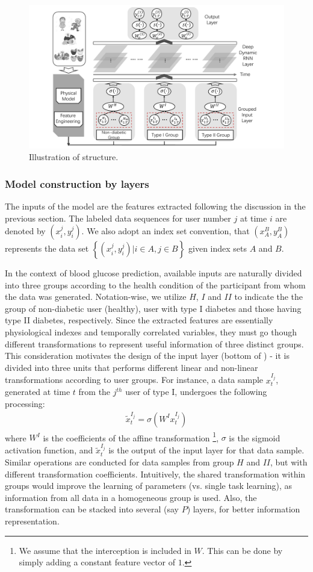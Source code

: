 \begin{figure}[h]
  \centering
  \includegraphics[width=0.75\columnwidth]{./img/pics_RNN3.pdf}
  \caption{Illustration of \modelname structure.}
  \label{fig:rnn}
\end{figure}

\subsubsection{Model construction by layers}
The inputs of the \modelname model are the features extracted following the discussion in the previous section.
The labeled data sequences for user number $j$ at time $i$ are denoted by $(x_i^{j},y_i^{j})$.
We also adopt an index set convention, that $(x_A^{B},y_A^B)$ represents the data set $\left\{(x_i^{j},y_i^{j}) | i \in A, j\in B\right\}$ given index sets $A$ and $B$.

In the context of blood glucose prediction, available inputs are naturally divided into three groups according to the health condition of the participant from whom the data was generated.
Notation-wise, we utilize $H$, $I$ and $II$ to indicate the the group of non-diabetic user (healthy), user with type I diabetes and those having type II diabetes, respectively.
Since the extracted features are essentially physiological indexes and temporally correlated variables, they must go though different transformations to represent useful information of three distinct groups.
This consideration motivates the design of the input layer (bottom of ) - it is divided into three units that performs different linear and non-linear transformations according to user groups.
For instance, a data sample $x_t^{I_j}$, generated at time $t$ from the $j^{th}$ user of type I, undergoes the following processing:
\begin{align}
\tilde{x}_t^{I_j} = \sigma \left( W^Ix_t^{I_j} \right)
\end{align}
where $W^I$ is the coefficients of the affine transformation \footnote{We assume that the interception is included in $W$. This can be done by simply adding a constant feature vector of $1$.}, $\sigma$ is the sigmoid activation function, and $\tilde{x}_t^{I_j}$ is the output of the input layer for that data sample.
Similar operations are conducted for data samples from group $H$ and $II$, but with different transformation coefficients.
Intuitively, the shared transformation within groups would improve the learning of parameters (vs. single task learning), as information from all data in a homogeneous group is used.
Also, the transformation can be stacked into several (say $P$) layers, for better information representation.


